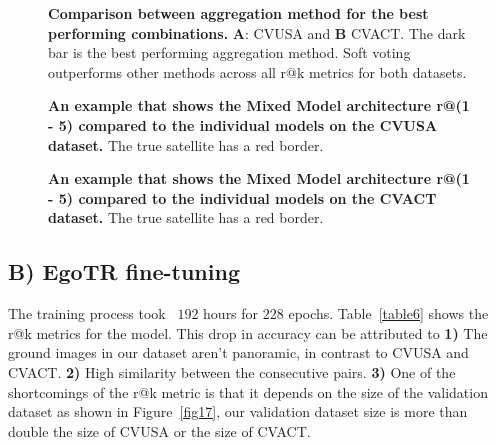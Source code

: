 \documentclass[10pt,letterpaper]{article}
\begin{document}
\begin{figure}[!h]
  \caption{{\bf Comparison between aggregation method for the best performing combinations. } {\bf A}: CVUSA and {\bf B} CVACT.  The dark bar is the best performing aggregation method. Soft voting outperforms other methods across all r@k metrics for both datasets.}
  
  \label{fig14}
\end{figure}

\begin{figure}[!h]
  \caption{{\bf An example that shows the Mixed Model architecture r@(1 - 5) compared to the individual models on the CVUSA dataset.} The true satellite has a red border.}
  \label{fig15}
\end{figure}

\begin{figure}[!h]
  \caption{{\bf An example that shows the Mixed Model architecture r@(1 - 5) compared to the individual models on the CVACT dataset.}  The true satellite has a red border.}
  \label{fig16}
\end{figure}

\subsection*{B) EgoTR fine-tuning}

The training process took ~$192$ hours for $228$ epochs. Table~\ref{table6} shows the r@k metrics for the model. This drop in accuracy can be attributed to {\bf 1)} The ground images in our dataset aren't panoramic, in contrast to CVUSA and CVACT. {\bf 2)} High similarity between the consecutive pairs. {\bf 3)} One of the shortcomings of the r@k metric is that it depends on the size of the validation dataset as shown in  Figure~\ref{fig17}, our validation dataset size is more than double the size of CVUSA or the size of CVACT.

\begin{table}[!ht]
  \centering
  \caption{
  {\bf r@k metrics of EgoTR fine-tuned over the reshaped BDD-trajectories dataset.}}
  \label{table6}
\end{table}
\end{document}
